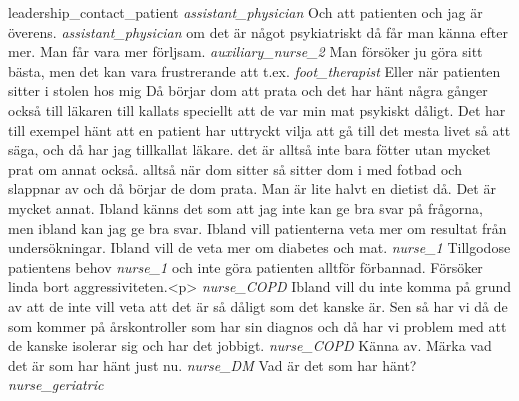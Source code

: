 \documentclass[12pt,a4paper,oneside]{article}
\begin{document}
leadership\_contact\_patient %
 {\it  assistant\_physician %
} 
Och att patienten och jag är överens. %
 {\it assistant\_physician %
} 
om det är något psykiatriskt då får man känna efter mer. Man får vara mer förljsam. %
 {\it auxiliary\_nurse\_2 %
} 
Man försöker ju göra sitt bästa, men det kan vara frustrerande att t.ex. %
 {\it foot\_therapist %
} 
Eller när patienten sitter i stolen hos mig Då börjar dom att prata och det har hänt några gånger också till läkaren till kallats speciellt att de var min mat psykiskt dåligt. Det har till exempel hänt att en patient har uttryckt vilja att gå till det mesta livet så att säga, och då har jag tillkallat läkare. det är alltså inte bara fötter utan mycket prat om annat också. alltså när dom sitter så sitter dom i med fotbad och slappnar av och då börjar de dom prata. Man är lite halvt en dietist då. Det är mycket annat. Ibland känns det som att jag inte kan ge bra svar på frågorna, men ibland kan jag ge bra svar. Ibland vill patienterna veta mer om resultat från undersökningar. Ibland vill de veta mer om diabetes och mat.  %
 {\it nurse\_1 %
} 
Tillgodose patientens behov %
 {\it nurse\_1 %
} 
och inte göra patienten alltför förbannad. Försöker linda bort aggressiviteten.<p> %
 {\it nurse\_COPD %
} 
Ibland vill du inte komma på grund av att de inte vill veta att det är så dåligt som det kanske är. Sen så har vi då de som kommer på årskontroller som har sin diagnos och då har vi problem med att de kanske isolerar sig och har det jobbigt. %
 {\it nurse\_COPD %
} 
Känna av. Märka vad det är som har hänt just nu. %
 {\it nurse\_DM %
} 
Vad är det som har hänt? %
 {\it nurse\_geriatric %
} 
\end{document}
